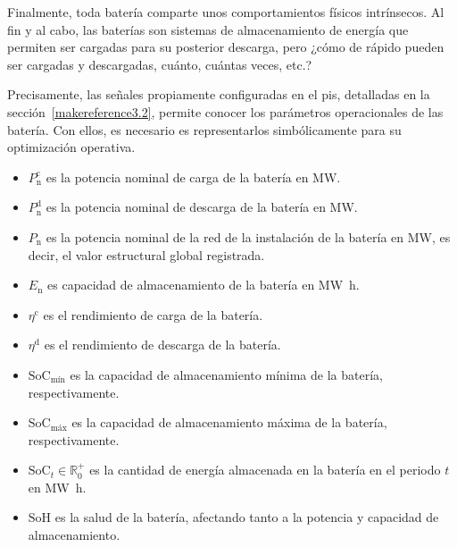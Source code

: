 Finalmente, toda batería comparte unos comportamientos físicos intrínsecos. Al fin y al cabo, las baterías son sistemas de almacenamiento de energía que permiten ser cargadas para su posterior descarga, pero ¿cómo de rápido pueden ser cargadas y descargadas, cuánto, cuántas veces, etc.?

Precisamente, las señales propiamente configuradas en el \gls{pis}, detalladas en la sección~\ref{makereference3.2}, permite conocer los parámetros operacionales de las batería. Con ellos, es necesario es representarlos simbólicamente para su optimización operativa.

\begin{itemize}

  \item \( P^{\mathrm{c}}_{\mathrm{n}} \) es la potencia nominal de carga de la batería en \si{\mega\watt}.

  \item \( P^{\mathrm{d}}_{\mathrm{n}} \) es la potencia nominal de descarga de la batería en \si{\mega\watt}.

  \item \( P_{\mathrm{n}} \) es la potencia nominal de la red de la instalación de la batería en \si{\mega\watt}, es decir, el valor estructural global registrada.

  \item \( E_{\mathrm{n}} \) es capacidad de almacenamiento de la batería en \si{{\mega\watt\hour}}.

  \item \( \eta^{\mathrm{c}} \) es el rendimiento de carga de la batería.

  \item \( \eta^{\mathrm{d}} \) es el rendimiento de descarga de la batería.

  \item \( \mathrm{SoC}_{\text{mín}} \) es la capacidad de almacenamiento mínima de la batería, respectivamente.

  \item \( \mathrm{SoC}_{\text{máx}} \) es la capacidad de almacenamiento máxima de la batería, respectivamente.

  \item \( \mathrm{SoC}_{t} \in \mathbb{R}^{+}_{0} \) es la cantidad de energía almacenada en la batería en el periodo \( t \) en \si{{\mega\watt\hour}}.

  \item \( \mathrm{SoH} \) es la salud de la batería, afectando tanto a la potencia y capacidad de almacenamiento.


\end{itemize}
